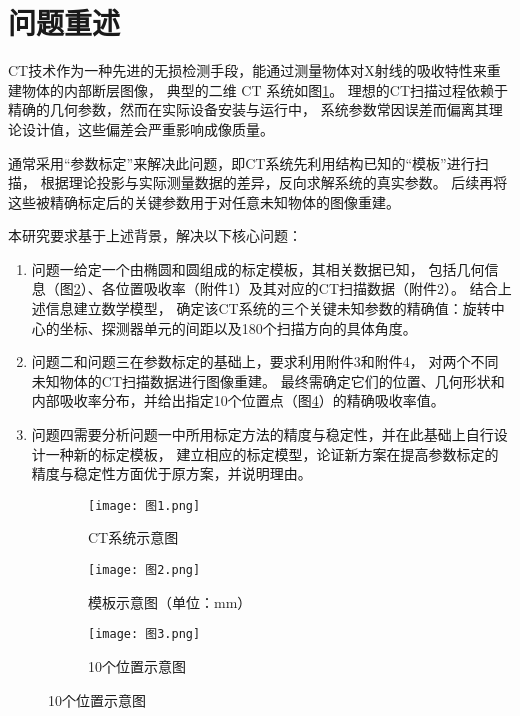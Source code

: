 \section{\heiti 问题重述}
CT技术作为一种先进的无损检测手段，能通过测量物体对X射线的吸收特性来重建物体的内部断层图像，
典型的二维 CT 系统如图\ref{fig:p1}。
理想的CT扫描过程依赖于精确的几何参数，然而在实际设备安装与运行中，
系统参数常因误差而偏离其理论设计值，这些偏差会严重影响成像质量。
\par
通常采用“参数标定”来解决此问题，即CT系统先利用结构已知的“模板”进行扫描，
根据理论投影与实际测量数据的差异，反向求解系统的真实参数。
后续再将这些被精确标定后的关键参数用于对任意未知物体的图像重建。
\par
本研究要求基于上述背景，解决以下核心问题：

\begin{enumerate}[label=(\arabic*), left=0.5em]
    \item 问题一给定一个由椭圆和圆组成的标定模板，其相关数据已知，
    包括几何信息（图\ref{fig:p2}）、各位置吸收率（附件1）及其对应的CT扫描数据（附件2）。
    结合上述信息建立数学模型，
    确定该CT系统的三个关键未知参数的精确值：旋转中心的坐标、探测器单元的间距以及180个扫描方向的具体角度。
    \item 问题二和问题三在参数标定的基础上，要求利用附件3和附件4，
    对两个不同未知物体的CT扫描数据进行图像重建。
    最终需确定它们的位置、几何形状和内部吸收率分布，并给出指定10个位置点（图\ref{fig:p3}）的精确吸收率值。
    \item 问题四需要分析问题一中所用标定方法的精度与稳定性，并在此基础上自行设计一种新的标定模板，
    建立相应的标定模型，论证新方案在提高参数标定的精度与稳定性方面优于原方案，并说明理由。
\end{enumerate}

\begin{figure}[htbp]
    \centering 

    \begin{subfigure}{0.3\textwidth}
        \centering
        \texttt{[image: 图1.png]}
        \caption{CT系统示意图}
        \label{fig:p1}
    \end{subfigure}
    \hfill 
    \begin{subfigure}{0.3\textwidth}
        \centering
        \texttt{[image: 图2.png]}
        \caption{模板示意图（单位：mm）}
        \label{fig:p2}
    \end{subfigure}
    \hfill 
    \begin{subfigure}{0.3\textwidth}
        \centering
        \texttt{[image: 图3.png]}
        \caption{10个位置示意图}
        \label{fig:p3}
    \end{subfigure}

\end{figure}

